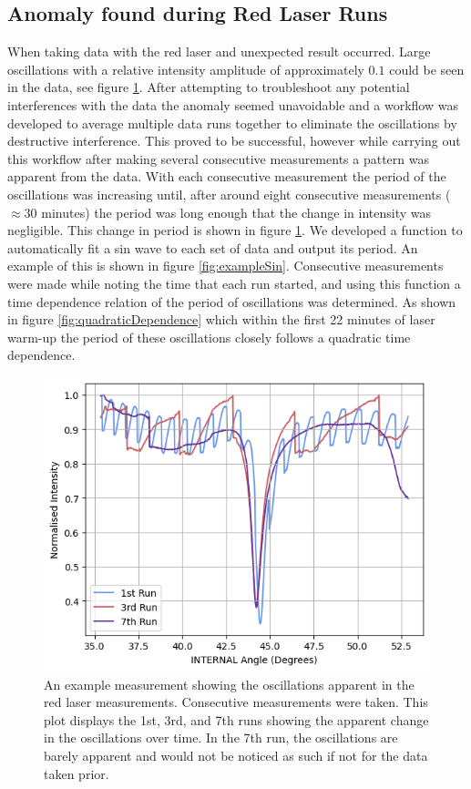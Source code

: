 \documentclass[%
reprint,
amsmath,amssymb,
aps,
]{revtex4-2}
\begin{document}
		\subsection{Anomaly found during Red Laser Runs}
			When taking data with the red laser and unexpected result occurred. Large oscillations with a relative intensity amplitude of approximately $0.1$ could be seen in the data, see figure \ref{fig:oscillationsExample}. After attempting to troubleshoot any potential interferences with the data the anomaly seemed unavoidable and a workflow was developed to average multiple data runs together to eliminate the oscillations by destructive interference. This proved to be successful, however while carrying out this workflow after making several consecutive measurements a pattern was apparent from the data. With each consecutive measurement the period of the oscillations was increasing until, after around eight consecutive measurements ($\approx$30 minutes) the period was long enough that the change in intensity was negligible. This change in period is shown in figure \ref{fig:oscillationsExample}. We developed a function to automatically fit a sin wave to each set of data and output its period. An example of this is shown in figure \ref{fig:exampleSin}. Consecutive measurements were made while noting the time that each run started, and using this function a time dependence relation of the period of oscillations was determined. As shown in figure \ref{fig:quadraticDependence} which within the first 22 minutes of laser warm-up the period of these oscillations closely follows a quadratic time dependence. \\
			
			\begin{figure}
				\includegraphics[width=0.85\columnwidth]{oscillationsExample.png}
				\caption{\label{fig:oscillationsExample}An example measurement showing the oscillations apparent in the red laser measurements. Consecutive measurements were taken. This plot displays the 1st, 3rd, and 7th runs showing the apparent change in the oscillations over time. In the 7th run, the oscillations are barely apparent and would not be noticed as such if not for the data taken prior.}
			\end{figure}
		
\end{document}
